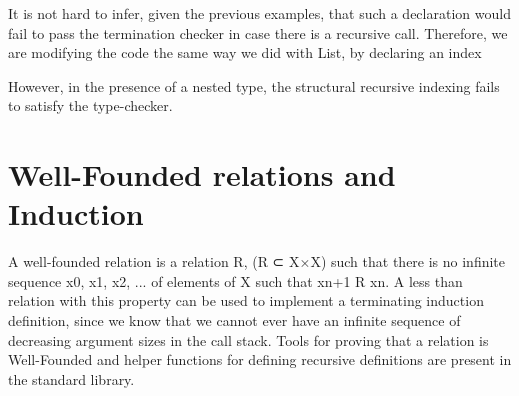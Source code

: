 \documentclass[12pt,twoside,notitlepage]{report}
\newcommand{\Conid}[1]{\mathit{#1}}
\newcommand{\Varid}[1]{\mathit{#1}}
\def\resethooks{%
  \global\let\SaveRestoreHook\empty
  \global\let\ColumnHook\empty}
\newlength{\blanklineskip}
\newcommand{\hsindent}[1]{\quad}%
\let\hspre\empty
\let\hspost\empty
\begin{document}
It is not hard to infer, given the previous examples, that such a declaration would fail to pass the termination checker in case there is a recursive call. Therefore, we are modifying the code the same way we did with List, by declaring an index

\resethooks


However, in the presence of a nested type, the structural recursive indexing fails to satisfy the type-checker.

\section{Well-Founded relations and Induction}

A well-founded relation is a relation R, (R ⊂ X×X) such that there is no infinite sequence x0, x1, x2, ... of elements of X such that xn+1 R xn. A less than
relation with this property can be used to implement a terminating induction definition, since we know that we cannot ever have an infinite sequence of
decreasing argument sizes in the call stack.
Tools for proving that a relation is Well-Founded and helper functions for defining recursive definitions are present in the standard library.
\end{document}
